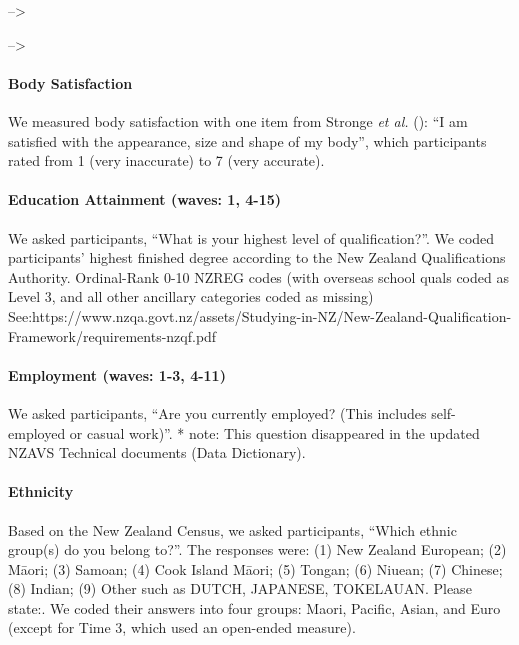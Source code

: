 \documentclass[
  singlecolumn]{article}
\let\oldparagraph\paragraph
\renewcommand{\paragraph}[1]{\oldparagraph{#1}\mbox{}}
\begin{document}
--\textgreater{}

--\textgreater{}

\paragraph{Body Satisfaction}\label{body-satisfaction}

We measured body satisfaction with one item from Stronge \emph{et al.}
(): ``I am satisfied with the
appearance, size and shape of my body'', which participants rated from 1
(very inaccurate) to 7 (very accurate).

\paragraph{Education Attainment (waves: 1,
4-15)}\label{education-attainment-waves-1-4-15}

We asked participants, ``What is your highest level of qualification?''.
We coded participants' highest finished degree according to the New
Zealand Qualifications Authority. Ordinal-Rank 0-10 NZREG codes (with
overseas school quals coded as Level 3, and all other ancillary
categories coded as missing)
See:https://www.nzqa.govt.nz/assets/Studying-in-NZ/New-Zealand-Qualification-Framework/requirements-nzqf.pdf

\paragraph{Employment (waves: 1-3,
4-11)}\label{employment-waves-1-3-4-11}

We asked participants, ``Are you currently employed? (This includes
self-employed or casual work)''. * note: This question disappeared in
the updated NZAVS Technical documents (Data Dictionary).

\paragraph{Ethnicity}\label{ethnicity}

Based on the New Zealand Census, we asked participants, ``Which ethnic
group(s) do you belong to?''. The responses were: (1) New Zealand
European; (2) Māori; (3) Samoan; (4) Cook Island Māori; (5) Tongan; (6)
Niuean; (7) Chinese; (8) Indian; (9) Other such as DUTCH, JAPANESE,
TOKELAUAN. Please state:. We coded their answers into four groups:
Maori, Pacific, Asian, and Euro (except for Time 3, which used an
open-ended measure).
\end{document}
